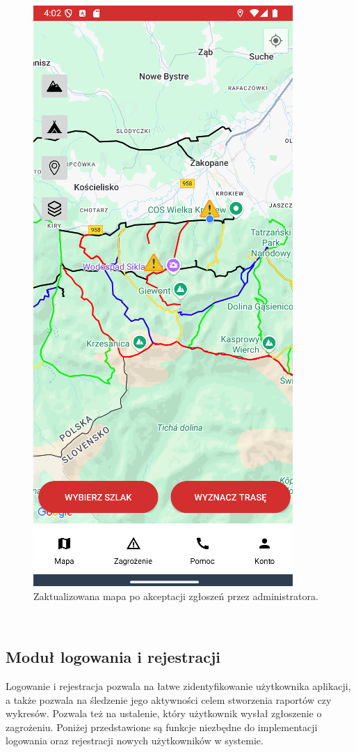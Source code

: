 \noindent
\setlength{\fboxrule}{0.5pt}
\begin{figure}[H]
    \centering
    \includegraphics[scale=0.6]{img/imp/test-accpeted.png}
    \caption{Zaktualizowana mapa po akceptacji zgłoszeń przez administratora.}
    \label{widok:markeraccepted1}
\end{figure}
\\
\subsection{Moduł logowania i rejestracji}
Logowanie i rejestracja pozwala na łatwe zidentyfikowanie użytkownika aplikacji, a także pozwala na śledzenie jego aktywności celem stworzenia raportów czy wykresów. Pozwala też na ustalenie, który użytkownik wysłał zgłoszenie o zagrożeniu. Poniżej przedstawione są funkcje niezbędne do implementacji logowania oraz rejestracji nowych użytkowników w systemie.
\\

